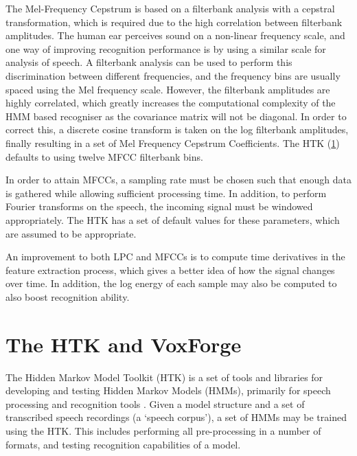 	The Mel-Frequency Cepstrum is based on a filterbank analysis with a cepstral transformation, which is required due to the high correlation between filterbank amplitudes.  The human ear perceives sound on a non-linear frequency scale, and one way of improving recognition performance is by using a similar scale for analysis of speech.  A filterbank analysis can be used to perform this discrimination between different frequencies, and the frequency bins are usually spaced using the Mel frequency scale.  However, the filterbank amplitudes are highly correlated, which greatly increases the computational complexity of the HMM based recogniser as the covariance matrix will not be diagonal.  In order to correct this, a discrete cosine transform is taken on the log filterbank amplitudes, finally resulting in a set of Mel Frequency Cepstrum Coefficients.  The HTK (\ref{sec:the_htk}) defaults to using twelve MFCC filterbank bins. \cite{htkbook} \cite{melnikoff2003speech}

	In order to attain MFCCs, a sampling rate must be chosen such that enough data is gathered while allowing sufficient processing time.  In addition, to perform Fourier transforms on the speech, the incoming signal must be windowed appropriately.  The HTK has a set of default values for these parameters, which are assumed to be appropriate.

	An improvement to both LPC and MFCCs is to compute time derivatives in the feature extraction process, which gives a better idea of how the signal changes over time.  In addition, the log energy of each sample may also be computed to also boost recognition ability.


\section{The HTK and VoxForge} %
\label{sec:the_htk}
	The Hidden Markov Model Toolkit (HTK) is a set of tools and libraries for developing and testing Hidden Markov Models (HMMs), primarily for speech processing and recognition tools \cite{htkbook}.  Given a model structure and a set of transcribed speech recordings (a `speech corpus'), a set of HMMs may be trained using the HTK.  This includes performing all pre-processing in a number of formats, and testing recognition capabilities of a model.

